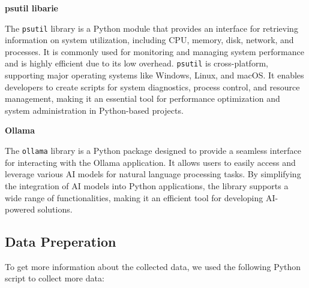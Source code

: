 \textbf{psutil libarie}

The \texttt{psutil} library is a Python module that provides an interface for retrieving information on system utilization, 
including CPU, memory, disk, network, and processes. It is commonly used for monitoring and managing system performance and is 
highly efficient due to its low overhead. \texttt{psutil} is cross-platform, supporting major operating systems like Windows, 
Linux, and macOS. It enables developers to create scripts for system diagnostics, process control, and resource management, 
making it an essential tool for performance optimization and system administration in Python-based projects.

\cite{psutil-library-explanation}

\textbf{Ollama}

The \texttt{ollama} library is a Python package designed to provide a seamless interface for interacting with the Ollama application. 
It allows users to easily access and leverage various AI models for natural language processing tasks. 
By simplifying the integration of AI models into Python applications, the library supports a wide range of functionalities, 
making it an efficient tool for developing AI-powered solutions.

\cite{ollama-python-documentation-github}


\subsection{Data Preperation}

To get more information about the collected data, we used the following Python script to collect more data:

